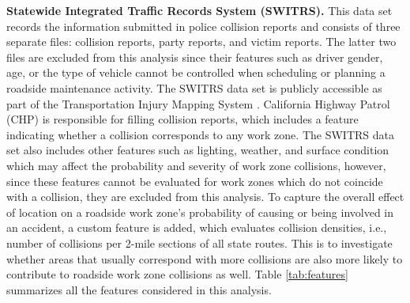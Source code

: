 \documentclass[10pt,a4paper]{article}
\begin{document}
\noindent\textbf{Statewide Integrated Traffic Records System (SWITRS).} This data set records the information submitted in police collision reports and consists of three separate files: collision reports, party reports, and victim reports. The latter two files are excluded from this analysis since their features such as driver gender, age, or the type of vehicle cannot be controlled when scheduling or planning a roadside maintenance activity. The SWITRS data set is publicly accessible as part of the Transportation Injury Mapping System \citep{tims2019}. California Highway Patrol (CHP) is responsible for filling collision reports, which includes a feature indicating whether a collision corresponds to any work zone. The SWITRS data set also includes other features such as lighting, weather, and surface condition which may affect the probability and severity of work zone collisions, however, since these features cannot be evaluated for work zones which do not coincide with a collision, they are excluded from this analysis. To capture the overall effect of location on a roadside work zone's probability of causing or being involved in an accident, a custom feature is added, which evaluates collision densities, i.e., number of collisions per 2-mile sections of all state routes. This is to investigate whether areas that usually correspond with more collisions are also more likely to contribute to roadside work zone collisions as well. Table \ref{tab:features} summarizes all the features considered in this analysis.
\end{document}
